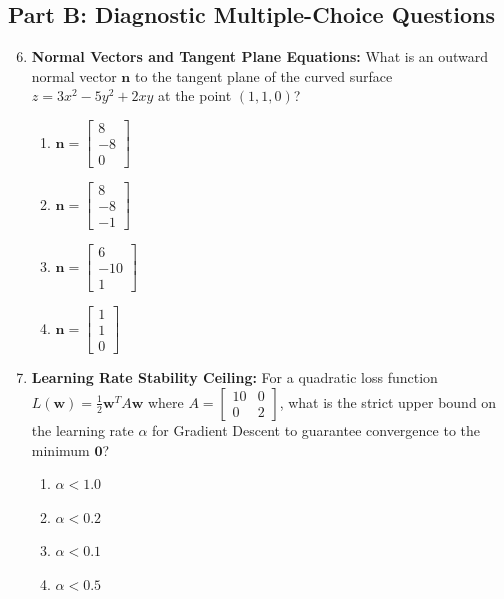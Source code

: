 \subsection*{Part B: Diagnostic Multiple-Choice Questions}
\begin{enumerate}
\setcounter{enumi}{5}
\item \textbf{Normal Vectors and Tangent Plane Equations:} What is an outward normal vector $\mathbf{n}$ to the tangent plane of the curved surface $z = 3x^2 - 5y^2 + 2xy$ at the point $(1, 1, 0)$?
\begin{enumerate}
    \item $\mathbf{n} = \begin{bmatrix} 8 \\ -8 \\ 0 \end{bmatrix}$
    \item $\mathbf{n} = \begin{bmatrix} 8 \\ -8 \\ -1 \end{bmatrix}$
    \item $\mathbf{n} = \begin{bmatrix} 6 \\ -10 \\ 1 \end{bmatrix}$
    \item $\mathbf{n} = \begin{bmatrix} 1 \\ 1 \\ 0 \end{bmatrix}$
\end{enumerate}

\item \textbf{Learning Rate Stability Ceiling:} For a quadratic loss function $L(\mathbf{w}) = \frac{1}{2} \mathbf{w}^T A \mathbf{w}$ where $A = \begin{bmatrix} 10 & 0 \\ 0 & 2 \end{bmatrix}$, what is the strict upper bound on the learning rate $\alpha$ for Gradient Descent to guarantee convergence to the minimum $\mathbf{0}$?
\begin{enumerate}
    \item $\alpha < 1.0$
    \item $\alpha < 0.2$
    \item $\alpha < 0.1$
    \item $\alpha < 0.5$
\end{enumerate}
\end{enumerate}
